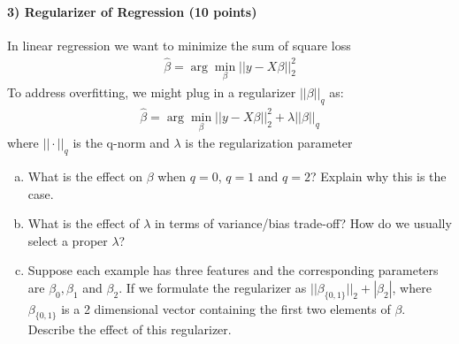 \documentclass[11pt]{article}
\begin{document}
\paragraph{3) Regularizer of Regression (10 points)}
In linear regression we want to minimize the sum of square loss
\begin{align}
\hat{\beta}=\arg\!\min\limits_{\beta}||y-X\beta||_2^2
\end{align}
To address overfitting, we might plug in a regularizer $||\beta||_q$ as:
\begin{align}
\hat{\beta}=\arg\!\min\limits_{\beta}||y-X\beta||_2^2+\lambda||\beta||_q
\end{align}
where $||\cdot||_q$ is the q-norm and $\lambda$ is the regularization parameter
\begin{enumerate}[(a)]
\item
What is the effect on $\beta$ when $q=0$, $q=1$ and $q=2$? Explain why this is the case.
\item
What is the effect of $\lambda$ in terms of variance/bias trade-off? How do we usually select a proper $\lambda$?
\item
Suppose each example has three features and the corresponding parameters are $\beta_0,\beta_1$ and $\beta_2$. If we formulate the regularizer as $||\beta_{\{0,1\}}||_2+|\beta_2|$, where $\beta_{\{0,1\}}$ is a 2 dimensional vector containing the first two elements of $\beta$. Describe the effect of this regularizer.
\end{enumerate}
\end{document}

